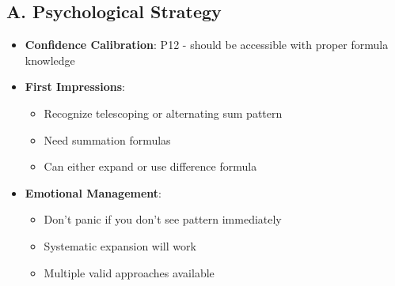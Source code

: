 \documentclass[12pt]{article}
\begin{document}
\begin{strategicbox}
\subsection*{A. Psychological Strategy}
\begin{itemize}[leftmargin=*]
    \item \textbf{Confidence Calibration}: P12 - should be accessible with proper formula knowledge
    \item \textbf{First Impressions}: 
    \begin{itemize}
        \item Recognize telescoping or alternating sum pattern
        \item Need summation formulas
        \item Can either expand or use difference formula
    \end{itemize}
    \item \textbf{Emotional Management}: 
    \begin{itemize}
        \item Don't panic if you don't see pattern immediately
        \item Systematic expansion will work
        \item Multiple valid approaches available
    \end{itemize}
\end{itemize}


\end{strategicbox}
\end{document}
